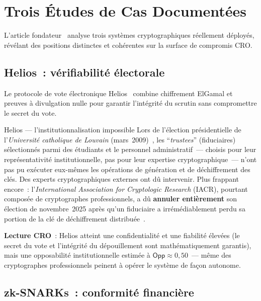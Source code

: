\section{Trois Études de Cas Documentées}
\label{sec:etudes-cas}

L'article fondateur~\cite{minka2026clo} analyse trois systèmes
cryptographiques réellement déployés, révélant des positions
distinctes et cohérentes sur la surface de compromis CRO.

\subsection{Helios~: vérifiabilité électorale}

Le protocole de vote électronique Helios~\cite{adida2009helios}
combine chiffrement ElGamal et preuves à divulgation nulle pour
garantir l'intégrité du scrutin sans compromettre le secret du vote.

\begin{boxscenario}{Helios --- l'institutionnalisation impossible}
Lors de l'élection présidentielle de l'\textit{Université catholique
de Louvain} (mars~2009)~\cite{adida2009university}, les
``\textit{trustees}'' (fiduciaires) sélectionnés parmi des étudiants
et le personnel administratif~--- choisis pour leur représentativité
institutionnelle, pas pour leur expertise cryptographique~---
n'ont pas pu exécuter eux-mêmes les opérations de génération et de
déchiffrement des clés. Des experts cryptographiques externes ont
dû intervenir. Plus frappant encore~: l'\textit{International
Association for Cryptologic Research} (IACR), pourtant composée
de cryptographes professionnels, a dû \textbf{annuler entièrement}
son élection de novembre~2025 après qu'un fiduciaire a
irrémédiablement perdu sa portion de la clé de déchiffrement
distribuée~\cite{iacr2025}.
\end{boxscenario}

\textbf{Lecture CRO}~: Helios atteint une confidentialité et une
fiabilité élevées (le secret du vote et l'intégrité du dépouillement
sont mathématiquement garantis), mais une opposabilité
institutionnelle estimée à $\mathsf{Opp} \approx 0{,}50$~--- même
des cryptographes professionnels peinent à opérer le système de
façon autonome.

\subsection{zk-SNARKs~: conformité financière}

